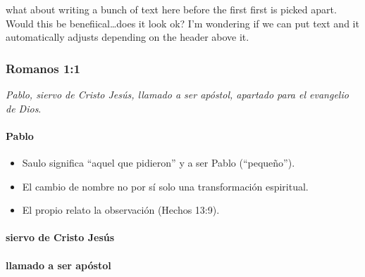 what about writing a bunch of text here before the first first is picked
apart. Would this be benefiical\ldots does it look ok? I'm wondering if
we can put text and it automatically adjusts depending on the header
above it.

\subsubsection{Romanos 1:1}\label{romanos-11}

\begin{verseblock}
\textit{Pablo, siervo de Cristo Jesús, llamado a ser apóstol, apartado para el evangelio de Dios}.
\end{verseblock}

\paragraph{Pablo}\label{pablo}



\begin{commentblock}

\begin{itemize}
\tightlist
\item
  Saulo significa ``aquel que pidieron'' y  a ser Pablo
  (``pequeño'').
\item
  El cambio de nombre no  por sí solo una transformación
  espiritual.
\item
  El propio relato  la observación (Hechos 13:9).
\end{itemize}

\end{commentblock}

\paragraph{siervo de Cristo Jesús}\label{siervo-de-cristo-jesuxfas}



\paragraph{llamado a ser apóstol}\label{llamado-a-ser-apuxf3stol}


